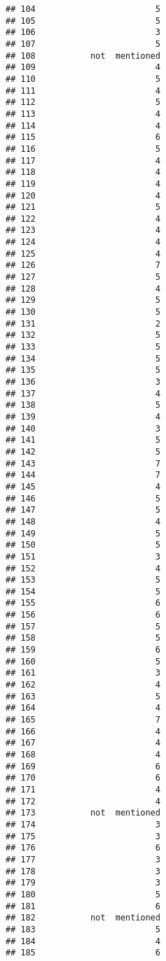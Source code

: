 \documentclass[
]{article}
\begin{document}
\begin{verbatim}
## 104                        5
## 105                        5
## 106                        3
## 107                        5
## 108           not  mentioned
## 109                        4
## 110                        5
## 111                        4
## 112                        5
## 113                        4
## 114                        4
## 115                        6
## 116                        5
## 117                        4
## 118                        4
## 119                        4
## 120                        4
## 121                        5
## 122                        4
## 123                        4
## 124                        4
## 125                        4
## 126                        7
## 127                        5
## 128                        4
## 129                        5
## 130                        5
## 131                        2
## 132                        5
## 133                        5
## 134                        5
## 135                        5
## 136                        3
## 137                        4
## 138                        5
## 139                        4
## 140                        3
## 141                        5
## 142                        5
## 143                        7
## 144                        7
## 145                        4
## 146                        5
## 147                        5
## 148                        4
## 149                        5
## 150                        5
## 151                        3
## 152                        4
## 153                        5
## 154                        5
## 155                        6
## 156                        6
## 157                        5
## 158                        5
## 159                        6
## 160                        5
## 161                        3
## 162                        4
## 163                        5
## 164                        4
## 165                        7
## 166                        4
## 167                        4
## 168                        4
## 169                        6
## 170                        6
## 171                        4
## 172                        4
## 173           not  mentioned
## 174                        3
## 175                        3
## 176                        6
## 177                        3
## 178                        3
## 179                        3
## 180                        5
## 181                        6
## 182           not  mentioned
## 183                        5
## 184                        4
## 185                        6

\end{verbatim}
\end{document}
